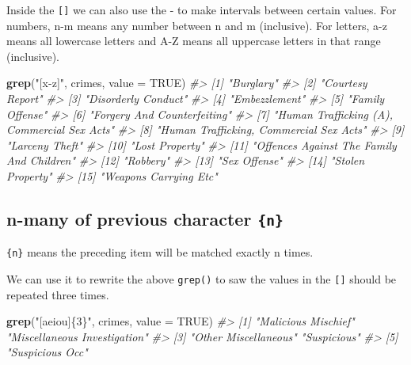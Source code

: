 \documentclass[
  12pt,
]{book}
\newenvironment{Shaded}{\begin{snugshade}}{\end{snugshade}}
\newcommand{\CommentTok}[1]{\textcolor[rgb]{0.37,0.37,0.37}{\textit{#1}}}
\newcommand{\DataTypeTok}[1]{\textcolor[rgb]{0.27,0.27,0.27}{#1}}
\newcommand{\KeywordTok}[1]{\textcolor[rgb]{0.27,0.27,0.27}{\textbf{#1}}}
\newcommand{\NormalTok}[1]{#1}
\newcommand{\OtherTok}[1]{\textcolor[rgb]{0.37,0.37,0.37}{#1}}
\newcommand{\StringTok}[1]{\textcolor[rgb]{0.5,0.5,0.5}{#1}}
\begin{document}
Inside the \texttt{{[}{]}} we can also use the - to make intervals between certain values. For numbers, n-m means any number between n and m (inclusive). For letters, a-z means all lowercase letters and A-Z means all uppercase letters in that range (inclusive).

\begin{Shaded}
\begin{Highlighting}[]
\KeywordTok{grep}\NormalTok{(}\StringTok{"[x{-}z]"}\NormalTok{, crimes, }\DataTypeTok{value =} \OtherTok{TRUE}\NormalTok{)}
\CommentTok{\#\textgreater{}  [1] "Burglary"                                  }
\CommentTok{\#\textgreater{}  [2] "Courtesy Report"                           }
\CommentTok{\#\textgreater{}  [3] "Disorderly Conduct"                        }
\CommentTok{\#\textgreater{}  [4] "Embezzlement"                              }
\CommentTok{\#\textgreater{}  [5] "Family Offense"                            }
\CommentTok{\#\textgreater{}  [6] "Forgery And Counterfeiting"                }
\CommentTok{\#\textgreater{}  [7] "Human Trafficking (A), Commercial Sex Acts"}
\CommentTok{\#\textgreater{}  [8] "Human Trafficking, Commercial Sex Acts"    }
\CommentTok{\#\textgreater{}  [9] "Larceny Theft"                             }
\CommentTok{\#\textgreater{} [10] "Lost Property"                             }
\CommentTok{\#\textgreater{} [11] "Offences Against The Family And Children"  }
\CommentTok{\#\textgreater{} [12] "Robbery"                                   }
\CommentTok{\#\textgreater{} [13] "Sex Offense"                               }
\CommentTok{\#\textgreater{} [14] "Stolen Property"                           }
\CommentTok{\#\textgreater{} [15] "Weapons Carrying Etc"}
\end{Highlighting}
\end{Shaded}

\hypertarget{n-many-of-previous-character-n}{%
\subsection{\texorpdfstring{n-many of previous character \texttt{\{n\}}}{n-many of previous character \{n\}}}\label{n-many-of-previous-character-n}}

\texttt{\{n\}} means the preceding item will be matched exactly n times.

We can use it to rewrite the above \texttt{grep()} to saw the values in the \texttt{{[}{]}} should be repeated three times.

\begin{Shaded}
\begin{Highlighting}[]
\KeywordTok{grep}\NormalTok{(}\StringTok{"[aeiou]\{3\}"}\NormalTok{, crimes, }\DataTypeTok{value =} \OtherTok{TRUE}\NormalTok{)}
\CommentTok{\#\textgreater{} [1] "Malicious Mischief"          "Miscellaneous Investigation"}
\CommentTok{\#\textgreater{} [3] "Other Miscellaneous"         "Suspicious"                 }
\CommentTok{\#\textgreater{} [5] "Suspicious Occ"}
\end{Highlighting}
\end{Shaded}
\end{document}
